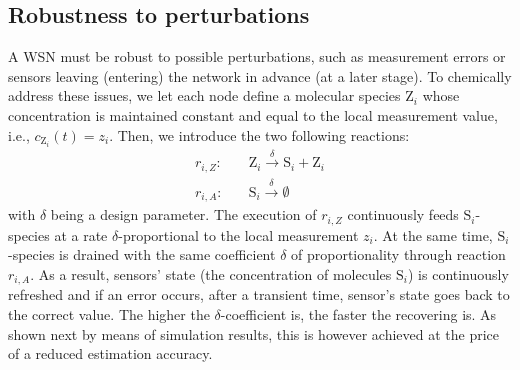 \documentclass[journal]{IEEEtran}
\newcommand{\mol}[1]{\ensuremath{\textrm{#1}}}
\begin{document}
\subsection{Robustness to perturbations}
{A WSN must be robust to possible perturbations, such as measurement errors or sensors leaving (entering) the network in advance (at a later stage). To chemically address these issues, we let each node define a molecular species $\mol{Z}_i$ whose concentration is maintained constant and equal to the local measurement value, i.e., $c_{\mol{Z}_i}(t) = z_i$. Then, we introduce the two following reactions:
\begin{subequations} \label{eq:perturbReact}
\begin{align} 
		\label{eq:errIn}
	    	 r_{i,Z}:\quad&	 \mol{Z}_i \stackrel{\delta}{\longrightarrow} 	\mol{S}_i + \mol{Z}_i	\\
		 \label{eq:errDrain}
		 r_{i,A}:\quad &  \mol{S}_i \stackrel{\delta}{\longrightarrow} 	\emptyset 
\end{align}		
\end{subequations}  
with $\delta$ being a design parameter. The execution of $r_{i,Z}$ continuously feeds $\mol{S}_i$-species at a rate $\delta$-proportional to the local measurement $z_i$. At the same time, $\mol{S}_i$-species is drained with the same coefficient $\delta$ of proportionality through reaction $r_{i,A}$. As a result, sensors' state (the concentration of molecules $\mol{S}_i$) is continuously refreshed and if an error occurs, after a transient time, sensor's state goes back to the correct value. The higher the $\delta$-coefficient is, the faster the recovering is. As shown next by means of simulation results, this is however achieved at the price of a reduced estimation accuracy. 


}
\end{document}
